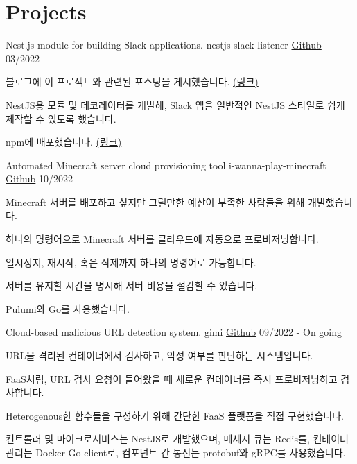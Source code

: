 \section{Projects}

\cventry
{Nest.js module for building Slack applications.}
{nestjs-slack-listener}
{\href{https://github.com/hanchchch/nestjs-slack-listener}{Github}}
{03/2022}
\begin{cvitems}
\item {블로그에 이 프로젝트와 관련된 포스팅을 게시했습니다. \href{https://velog.io/@hanchchch/%EC%A7%84%EC%8B%AC%EC%9C%BC%EB%A1%9C-%EC%97%85%EB%AC%B4-%EC%9E%90%EB%8F%99%ED%99%94-%EC%8A%AC%EB%9E%99%EB%B4%87-%EB%A7%8C%EB%93%A4%EA%B8%B0-1}{(링크)}}
\item {NestJS용 모듈 및 데코레이터를 개발해, Slack 앱을 일반적인 NestJS 스타일로 쉽게 제작할 수 있도록 했습니다.}
\item {npm에 배포했습니다. \href{https://www.npmjs.com/package/nestjs-slack-listener}{(링크)}}
\end{cvitems}

\cventry
{Automated Minecraft server cloud provisioning tool}
{i-wanna-play-minecraft}
{\href{https://github.com/hanchchch/i-wanna-play-minecraft}{Github}}
{10/2022}
\begin{cvitems}
\item {Minecraft 서버를 배포하고 싶지만 그럴만한 예산이 부족한 사람들을 위해 개발했습니다.}
\item {하나의 명령어으로 Minecraft 서버를 클라우드에 자동으로 프로비저닝합니다.}
\item {일시정지, 재시작, 혹은 삭제까지 하나의 명령어로 가능합니다.}
\item {서버를 유지할 시간을 명시해 서버 비용을 절감할 수 있습니다.}
\item {Pulumi와 Go를 사용했습니다.}
\end{cvitems}

\cventry
{Cloud-based malicious URL detection system.}
{gimi}
{\href{https://github.com/hanchchch/gimi}{Github}}
{09/2022 - On going}
\begin{cvitems}
\item {URL을 격리된 컨테이너에서 검사하고, 악성 여부를 판단하는 시스템입니다.}
\item {FaaS처럼, URL 검사 요청이 들어왔을 때 새로운 컨테이너를 즉시 프로비저닝하고 검사합니다.}
\item {Heterogenous한 함수들을 구성하기 위해 간단한 FaaS 플랫폼을 직접 구현했습니다.}
\item {컨트롤러 및 마이크로서비스는 NestJS로 개발했으며, 메세지 큐는 Redis를, 컨테이너 관리는 Docker Go client로, 컴포넌트 간 통신는 protobuf와 gRPC를 사용했습니다.}
\end{cvitems}
